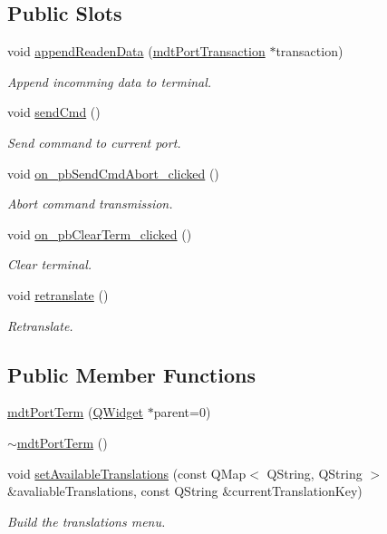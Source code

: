 \subsection*{Public Slots}
\begin{DoxyCompactItemize}
\item 
void \hyperlink{classmdt_port_term_a2c8de2e82437fc94420ccb542cc42bf2}{append\-Readen\-Data} (\hyperlink{classmdt_port_transaction}{mdt\-Port\-Transaction} $\ast$transaction)
\begin{DoxyCompactList}\small\item\em Append incomming data to terminal. \end{DoxyCompactList}\item 
void \hyperlink{classmdt_port_term_a7ec568c44f862fe7aee83f1a271ac6bb}{send\-Cmd} ()
\begin{DoxyCompactList}\small\item\em Send command to current port. \end{DoxyCompactList}\item 
void \hyperlink{classmdt_port_term_a1b232e686b401d7103eb1c682be330a9}{on\-\_\-pb\-Send\-Cmd\-Abort\-\_\-clicked} ()
\begin{DoxyCompactList}\small\item\em Abort command transmission. \end{DoxyCompactList}\item 
void \hyperlink{classmdt_port_term_abb3fc55837782dbea240b069a48b18ce}{on\-\_\-pb\-Clear\-Term\-\_\-clicked} ()
\begin{DoxyCompactList}\small\item\em Clear terminal. \end{DoxyCompactList}\item 
void \hyperlink{classmdt_port_term_a542e20f789bcdc5f2ddf2b6e698ceea2}{retranslate} ()
\begin{DoxyCompactList}\small\item\em Retranslate. \end{DoxyCompactList}\end{DoxyCompactItemize}
\subsection*{Public Member Functions}
\begin{DoxyCompactItemize}
\item 
\hyperlink{classmdt_port_term_a5e93890f53b5112be80983779a3ab233}{mdt\-Port\-Term} (\hyperlink{class_q_widget}{Q\-Widget} $\ast$parent=0)
\item 
\hyperlink{classmdt_port_term_a5576a15a2b6e39c149207ffdb7869ef7}{$\sim$mdt\-Port\-Term} ()
\item 
void \hyperlink{classmdt_port_term_af6f97444089eb87ec5db557a2ccb24db}{set\-Available\-Translations} (const Q\-Map$<$ Q\-String, Q\-String $>$ \&avaliable\-Translations, const Q\-String \&current\-Translation\-Key)
\begin{DoxyCompactList}\small\item\em Build the translations menu. \end{DoxyCompactList}\end{DoxyCompactItemize}
